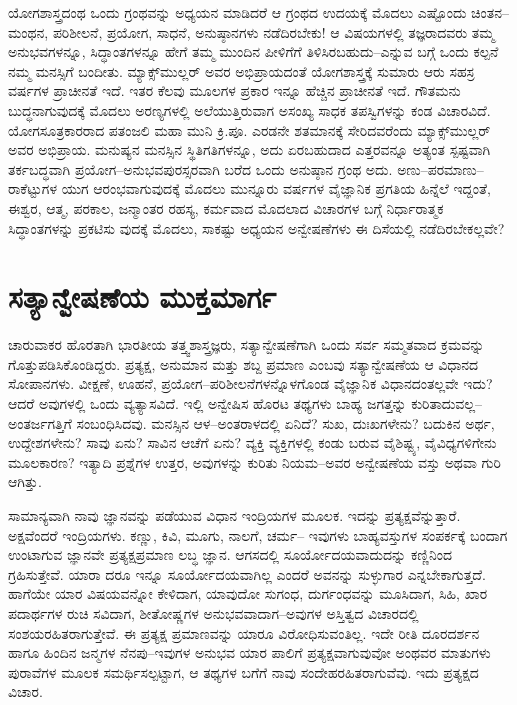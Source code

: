 ಯೋಗಶಾಸ್ತ್ರದಂಥ ಒಂದು ಗ್ರಂಥವನ್ನು ಅಧ್ಯಯನ ಮಾಡಿದರೆ ಆ ಗ್ರಂಥದ ಉದಯಕ್ಕೆ ಮೊದಲು ಎಷ್ಟೊಂದು ಚಿಂತನ–ಮಂಥನ, ಪರಿಶೀಲನೆ, ಪ್ರಯೋಗ, ಸಾಧನೆ, ಅನುಷ್ಠಾನಗಳು ನಡೆದಿರಬೇಕು! ಆ ವಿಷಯಗಳಲ್ಲಿ ತಜ್ಞರಾದವರು ತಮ್ಮ ಅನುಭವಗಳನ್ನೂ, ಸಿದ್ಧಾಂತಗಳನ್ನೂ ಹೇಗೆ ತಮ್ಮ ಮುಂದಿನ ಪೀಳಿಗೆಗೆ ತಿಳಿಸಿರಬಹುದು–ಎನ್ನುವ ಬಗ್ಗೆ ಒಂದು ಕಲ್ಪನೆ ನಮ್ಮ ಮನಸ್ಸಿಗೆ ಬಂದೀತು. ಮ್ಯಾಕ್ಸ್​ಮುಲ್ಲರ್ ಅವರ ಅಭಿಪ್ರಾಯದಂತೆ ಯೋಗಶಾಸ್ತ್ರಕ್ಕೆ ಸುಮಾರು ಆರು ಸಹಸ್ರ ವರ್ಷಗಳ ಪ್ರಾಚೀನತೆ ಇದೆ. ಇತರ ಕೆಲವು ಮೂಲಗಳ ಪ್ರಕಾರ ಇನ್ನೂ ಹೆಚ್ಚಿನ ಪ್ರಾಚೀನತೆ ಇದೆ. ಗೌತಮನು ಬುದ್ಧನಾಗುವುದಕ್ಕೆ ಮೊದಲು ಅರಣ್ಯಗಳಲ್ಲಿ ಅಲೆಯುತ್ತಿರುವಾಗ ಅಸಂಖ್ಯ ಸಾಧಕ ತಪಸ್ವಿಗಳನ್ನು ಕಂಡ ವಿಚಾರವಿದೆ. ಯೋಗಸೂತ್ರಕಾರರಾದ ಪತಂಜಲಿ ಮಹಾ ಮುನಿ ಕ್ರಿ.ಪೂ. ಎರಡನೇ ಶತಮಾನಕ್ಕೆ ಸೇರಿದವರೆಂದು ಮ್ಯಾಕ್ಸ್​ಮುಲ್ಲರ್ ಅವರ ಅಭಿಪ್ರಾಯ. ಮನುಷ್ಯನ ಮನಸ್ಸಿನ ಸ್ಥಿತಿಗತಿಗಳನ್ನೂ, ಅದು ಏರಬಹುದಾದ ಎತ್ತರವನ್ನೂ ಅತ್ಯಂತ ಸ್ಪಷ್ಟವಾಗಿ ತರ್ಕಬದ್ಧವಾಗಿ ಪ್ರಯೋಗ–ಅನುಭವಪುರಸ್ಸರವಾಗಿ ಬರೆದ ಒಂದು ಅನುಷ್ಠಾನ ಗ್ರಂಥ ಅದು. ಅಣು–ಪರಮಾಣು–ರಾಕೆಟ್ಟುಗಳ ಯುಗ ಆರಂಭವಾಗುವುದಕ್ಕೆ ಮೊದಲು ಮುನ್ನೂರು ವರ್ಷಗಳ ವೈಜ್ಞಾನಿಕ ಪ್ರಗತಿಯ ಹಿನ್ನೆಲೆ ಇದ್ದಂತೆ, ಈಶ್ವರ, ಆತ್ಮ, ಪರಕಾಲ, ಜನ್ಮಾಂತರ ರಹಸ್ಯ, ಕರ್ಮವಾದ ಮೊದಲಾದ ವಿಚಾರಗಳ ಬಗ್ಗೆ ನಿರ್ಧಾರಾತ್ಮಕ ಸಿದ್ಧಾಂತಗಳನ್ನು ಪ್ರಕಟಿಸು ವುದಕ್ಕೆ ಮೊದಲು, ಸಾಕಷ್ಟು ಅಧ್ಯಯನ ಅನ್ವೇಷಣೆಗಳು ಈ ದಿಸೆಯಲ್ಲಿ ನಡೆದಿರಬೇಕಲ್ಲವೇ?


\section{ಸತ್ಯಾನ್ವೇಷಣೆಯ ಮುಕ್ತಮಾರ್ಗ}

ಚಾರುವಾಕರ ಹೊರತಾಗಿ ಭಾರತೀಯ ತತ್ತ್ವಶಾಸ್ತ್ರಜ್ಞರು, ಸತ್ಯಾನ್ವೇಷಣೆಗಾಗಿ ಒಂದು ಸರ್ವ ಸಮ್ಮತವಾದ ಕ್ರಮವನ್ನು ಗೊತ್ತುಪಡಿಸಿಕೊಂಡಿದ್ದರು. ಪ್ರತ್ಯಕ್ಷ, ಅನುಮಾನ ಮತ್ತು ಶಬ್ದ ಪ್ರಮಾಣ ಎಂಬವು ಸತ್ಯಾನ್ವೇಷಣೆಯ ಆ ವಿಧಾನದ ಸೋಪಾನಗಳು. ವೀಕ್ಷಣೆ, ಊಹನೆ, ಪ್ರಯೋಗ–ಪರಿಶೀಲನೆಗಳನ್ನೊಳಗೊಂಡ ವೈಜ್ಞಾನಿಕ ವಿಧಾನದಂತಲ್ಲವೇ ಇದು? ಆದರೆ ಅವುಗಳಲ್ಲಿ ಒಂದು ವ್ಯತ್ಯಾಸವಿದೆ. ಇಲ್ಲಿ ಅನ್ವೇಷಿಸ ಹೊರಟ ತಥ್ಯಗಳು ಬಾಹ್ಯ ಜಗತ್ತನ್ನು ಕುರಿತಾದುವಲ್ಲ–ಅಂತರ್ಜಗತ್ತಿಗೆ ಸಂಬಂಧಿಸಿದವು. ಮನಸ್ಸಿನ ಆಳ–ಅಂತರಾಳದಲ್ಲಿ ಏನಿದೆ? ಸುಖ, ದುಃಖಗಳೇನು? ಬದುಕಿನ ಅರ್ಥ, ಉದ್ದೇಶಗಳೇನು? ಸಾವು ಏನು? ಸಾವಿನ ಆಚೆಗೆ ಏನು? ವ್ಯಕ್ತಿ ವ್ಯಕ್ತಿಗಳಲ್ಲಿ ಕಂಡು ಬರುವ ವೈಶಿಷ್ಟ್ಯ, ವೈವಿಧ್ಯಗಳಿಗೇನು ಮೂಲಕಾರಣ? ಇತ್ಯಾದಿ ಪ್ರಶ್ನೆಗಳ ಉತ್ತರ, ಅವುಗಳನ್ನು ಕುರಿತು ನಿಯಮ–ಅವರ ಅನ್ವೇಷಣೆಯ ವಸ್ತು ಅಥವಾ ಗುರಿ ಆಗಿತ್ತು.

ಸಾಮಾನ್ಯವಾಗಿ ನಾವು ಜ್ಞಾನವನ್ನು ಪಡೆಯುವ ವಿಧಾನ ಇಂದ್ರಿಯಗಳ ಮೂಲಕ. ಇದನ್ನು ಪ್ರತ್ಯಕ್ಷವೆನ್ನುತ್ತಾರೆ. ಅಕ್ಷವೆಂದರೆ ಇಂದ್ರಿಯಗಳು. ಕಣ್ಣು, ಕಿವಿ, ಮೂಗು, ನಾಲಗೆ, ಚರ್ಮ– ಇವುಗಳು ಬಾಹ್ಯವಸ್ತುಗಳ ಸಂಪರ್ಕಕ್ಕೆ ಬಂದಾಗ ಉಂಟಾಗುವ ಜ್ಞಾನವೇ ಪ್ರತ್ಯಕ್ಷಪ್ರಮಾಣ ಲಬ್ಧ ಜ್ಞಾನ. ಆಗಸದಲ್ಲಿ ಸೂರ್ಯೋದಯವಾದುದನ್ನು ಕಣ್ಣಿನಿಂದ ಗ್ರಹಿಸುತ್ತೇವೆ. ಯಾರಾ ದರೂ ಇನ್ನೂ ಸೂರ್ಯೋದಯವಾಗಿಲ್ಲ ಎಂದರೆ ಅವನನ್ನು ಸುಳ್ಳುಗಾರ ಎನ್ನಬೇಕಾಗುತ್ತದೆ. ಹಾಗೆಯೇ ಯಾರ ವಿಷಯವನ್ನೋ ಕೇಳಿದಾಗ, ಯಾವುದೋ ಸುಗಂಧ, ದುರ್ಗಂಧವನ್ನು ಮೂಸಿದಾಗ, ಸಿಹಿ, ಖಾರ ಪದಾರ್ಥಗಳ ರುಚಿ ಸವಿದಾಗ, ಶೀತೋಷ್ಣಗಳ ಅನುಭವವಾದಾಗ–ಅವುಗಳ ಅಸ್ತಿತ್ವದ ವಿಚಾರದಲ್ಲಿ ಸಂಶಯರಹಿತರಾಗುತ್ತೇವೆ. ಈ ಪ್ರತ್ಯಕ್ಷ ಪ್ರಮಾಣವನ್ನು ಯಾರೂ ವಿರೋಧಿಸುವಂತಿಲ್ಲ. ಇದೇ ರೀತಿ ದೂರದರ್ಶನ ಹಾಗೂ ಹಿಂದಿನ ಜನ್ಮಗಳ ನೆನಪು–ಇವುಗಳ ಅನುಭವ ಯಾರ ಪಾಲಿಗೆ ಪ್ರತ್ಯಕ್ಷವಾಗುವುವೋ ಅಂಥವರ ಮಾತುಗಳು ಪುರಾವೆಗಳ ಮೂಲಕ ಸಮರ್ಥಿಸಲ್ಪಟ್ಟಾಗ, ಆ ತಥ್ಯಗಳ ಬಗೆಗೆ ನಾವು ಸಂದೇಹರಹಿತರಾಗುವೆವು. ಇದು ಪ್ರತ್ಯಕ್ಷದ ವಿಚಾರ.

